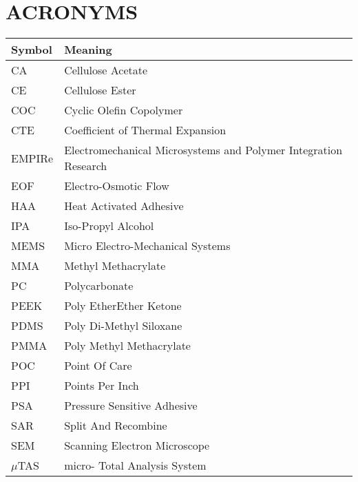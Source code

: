 

\chapter*{\center\Huge{ACRONYMS}}



\begin{center}\small
\begin{tabular}{ll}\hline
\textbf{Symbol} & \textbf{Meaning}\\\hline
CA & Cellulose Acetate\\
CE & Cellulose Ester\\
COC & Cyclic Olefin Copolymer\\
CTE &Coefficient of Thermal Expansion\\
EMPIRe & Electromechanical Microsystems and Polymer Integration Research\\
EOF & Electro-Osmotic Flow\\
HAA & Heat Activated Adhesive\\
IPA & Iso-Propyl Alcohol\\
MEMS & Micro Electro-Mechanical Systems\\
MMA & Methyl Methacrylate\\
PC & Polycarbonate\\
PEEK &Poly EtherEther Ketone\\
PDMS & Poly Di-Methyl Siloxane\\
PMMA & Poly Methyl Methacrylate\\
POC & Point Of Care\\
PPI & Points Per Inch\\
PSA &Pressure Sensitive Adhesive\\
SAR & Split And Recombine\\
SEM & Scanning Electron Microscope\\
$\mu$TAS & micro- Total Analysis System\\


\hline
\end{tabular}
\end{center}

